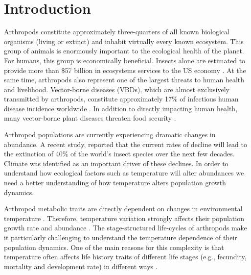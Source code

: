 
\section*{Introduction}
Arthropods constitute approximately three-quarters of all known biological organisms (living or extinct) and inhabit virtually every known ecosystem. This group of animals is enormously important to the ecological health of the planet. For humans, this group is economically beneficial. Insects alone are estimated to provide more than  \$57 billion in ecosystems services to the US economy \citep{Losey2006}. At the same time, arthropods also represent one of the largest threats to human health and livelihood. Vector-borne diseases (VBDs), which are almost exclusively transmitted by arthropods, constitute approximately 17\% of infectious human disease incidence worldwide \citep{WHO2004}. In addition to directly impacting human health, many vector-borne plant diseases threaten food security \citep{Nault1997, Childers2003, Kitajima2003, Rodrigues2003}. 

Arthropod populations are currently experiencing dramatic changes in abundance. A recent study, reported that the current rates of decline will lead to the extinction of 40\% of the world's insect species over the next few decades. Climate was identified as an important driver of these declines. In order to understand how ecological factors such as temperature will alter abundances we need a better understanding of how temperature alters population growth dynamics. 

Arthropod metabolic traits are directly dependent on changes in environmental temperature \citep{Tabachnick2010,Amarasekare2012a}. Therefore, temperature variation strongly affects their population growth rate and abundance \citep{Amarasekare2012a,Angilletta2009}. The stage-structured life-cycles of arthropods make it particularly challenging to understand the temperature dependence of their population dynamics. One of the main reasons for this complexity is that temperature often affects life history traits of different life stages (e.g., fecundity, mortality and development rate) in different ways \citep{Amarasekare2013,Mordecai2012,Dell2011a,Parham2010,Lunde2013}. 


